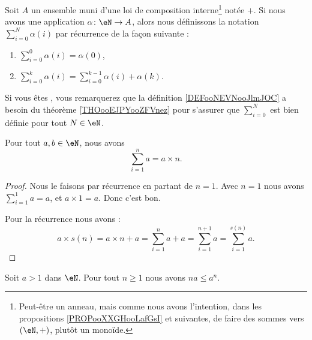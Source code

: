 \begin{definition}      \label{DEFooNEVNooJlmJOC}
	Soit \( A\) un ensemble muni d'une loi de composition interne\footnote{Peut-être un anneau, mais comme nous avons l'intention, dans les propositions \ref{PROPooXXGHooLafGsI} et suivantes, de faire des sommes vers \( (\eN,+)\), plutôt un monoïde.} notée \( +\). Si nous avons une application \( \alpha\colon \eN\to A\), alors nous définissons la notation \( \sum_{i=0}^N\alpha(i)\) par récurrence de la façon suivante :
	\begin{enumerate}
        \item       \label{ITEMooIPDTooEhOxea}
		      \( \sum_{i=0}^0\alpha(i)=\alpha(0)\),
		\item
		      \( \sum_{i=0}^{k}\alpha(i)=\sum_{i=0}^{k-1}\alpha(i)+\alpha(k)\).
	\end{enumerate}
\end{definition}

\begin{normaltext}      \label{NORMooKERZooGWhWwo}
	Si vous êtes , vous remarquerez que la définition \ref{DEFooNEVNooJlmJOC} a besoin du théorème \ref{THOooEJPYooZFVnez} pour s'assurer que \( \sum_{i=0}^N\) est bien définie pour tout \( N\in \eN\).
\end{normaltext}

\begin{proposition}        \label{PROPooXXGHooLafGsI}
	Pour tout \( a,b\in \eN\), nous avons
	\begin{equation}
		\sum_{i=1}^na=a\times n.
	\end{equation}
\end{proposition}

\begin{proof}
	Nous le faisons par récurrence en partant de \( n=1\). Avec \( n=1\) nous avons \( \sum_{i=1}^1a=a\), et \( a\times 1=a\). Donc c'est bon.

	Pour la récurrence nous avons :
	\begin{equation}
		a\times s(n)=a\times n+a=\sum_{i=1}^na+a=\sum_{i=1}^{n+1}a=\sum_{i=1}^{s(n)}a.
	\end{equation}
\end{proof}

\begin{lemma}       \label{LEMooIETGooMyrilW}
	Soit \( a>1\) dans \( \eN\). Pour tout \( n\geq 1\) nous avons \( na\leq a^n\).
\end{lemma}

